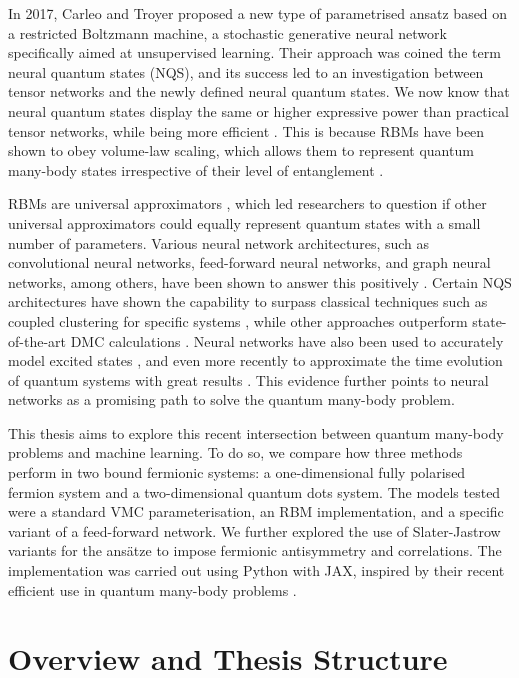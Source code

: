 In 2017, Carleo and Troyer \cite{carleo2017solving} proposed a new type of parametrised ansatz based on a restricted Boltzmann machine, a stochastic generative neural network specifically aimed at unsupervised learning. Their approach was coined the term neural quantum states (NQS), and its success led to an investigation between tensor networks and the newly defined neural quantum states. We now know that neural quantum states display the same or higher expressive power than practical tensor networks, while being more efficient \cite{sharir2022neural}. This is because RBMs have been shown to obey volume-law scaling, which allows them to represent quantum many-body states irrespective of their level of entanglement \cite{deng2017quantum}.

RBMs are universal approximators \cite{le2008representational}, which led researchers to question if other universal approximators could equally represent quantum states with a small number of parameters. Various neural network architectures, such as convolutional neural networks, feed-forward neural networks, and graph neural networks, among others, have been shown to answer this positively \cite{lange2024architectures}. Certain NQS architectures have shown the capability to surpass classical techniques such as coupled clustering for specific systems \cite{ferminet}, while other approaches outperform state-of-the-art DMC calculations \cite{kim2023neuralnetwork}. Neural networks have also been used to accurately model excited states \cite{pfau2023natural}, and even more recently to approximate the time evolution of
quantum systems with great results \cite{lawrence2024quantum}. This evidence further points to neural networks as a promising path to solve the quantum many-body problem.

This thesis aims to explore this recent intersection between quantum many-body problems and machine learning. To do so, we compare how three methods perform in two bound fermionic systems: a one-dimensional fully polarised fermion system and a two-dimensional quantum dots system. The models tested were a standard VMC parameterisation, an RBM implementation, and a specific variant of a feed-forward network. We further explored the use of Slater-Jastrow variants for the ansätze to impose fermionic antisymmetry and correlations. The implementation was carried out using Python with JAX, inspired by their recent efficient use in quantum many-body problems \cite{vicentini2022netket, jane}.

\section{Overview and Thesis Structure}

